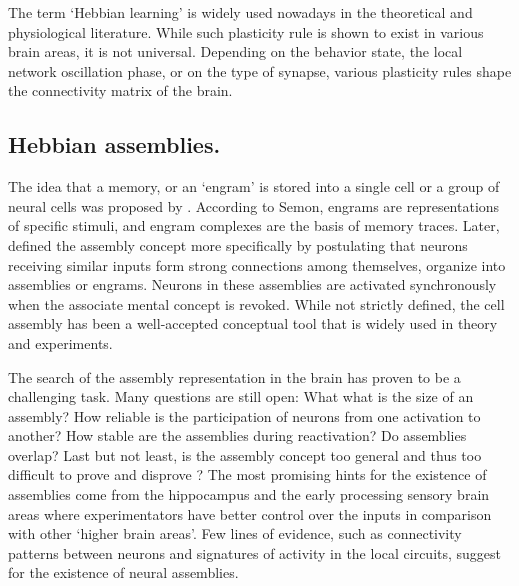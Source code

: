     The term `Hebbian learning' is widely used nowadays in the theoretical and
    physiological literature. While such plasticity rule is shown to exist in
    various brain areas, it is not universal. Depending on the behavior state,
    the local network oscillation phase, or on the type of synapse, various
    plasticity rules shape the connectivity matrix of the brain.

  \subsection{Hebbian assemblies.}
    The idea that a memory, or an `engram' is stored into a single cell or a
    group of neural cells was proposed by \cite{Semon1904}. According to Semon,
    engrams are representations of specific stimuli, and engram complexes are
    the basis of memory traces. Later, \cite{Hebb49} defined the assembly
    concept more specifically by postulating that neurons receiving similar
    inputs form strong connections among themselves, organize into assemblies
    or engrams. Neurons in these assemblies are activated synchronously when
    the associate mental concept is revoked. While not strictly defined, the
    cell assembly has been a well-accepted conceptual tool that is widely used
    in theory and experiments.
   
    The search of the assembly representation in the brain has proven to be a
    challenging task. Many questions are still open: What what is the size of
    an assembly? How reliable is the participation of neurons from one
    activation to another? How stable are the assemblies during reactivation?
    Do assemblies overlap? Last but not least, is the assembly concept too
    general and thus too difficult to prove and disprove \citep{Wallace2010}?
    The most promising hints for the existence of assemblies come from the
    hippocampus and the early processing sensory brain areas where
    experimentators have better control over the inputs in comparison with
    other `higher brain areas'. Few lines of evidence, such as connectivity
    patterns between neurons and signatures of activity in the local circuits,
    suggest for the existence of neural assemblies.
    

